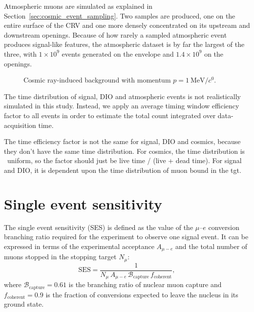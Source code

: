 Atmospheric muons are simulated as explained in
Section~\ref{sec:cosmic_event_sampling}. Two samples are produced, one on the
entire surface of the CRV and one more densely concentrated on its upstream
and downstream openings. Because of how rarely a sampled atmospheric event
produces signal-like features, the atmospheric dataset is by far the largest of
the three, with $1 \times 10^9$ events generated on the envelope and $1.4 \times
10^9$ on the openings.



\begin{figure}
    \centering
    
    \caption{Cosmic ray-induced background with momentum $p=\SI{1}{\MeV/\clight}$.}
    \label{fig:cosmic_bg_in_cydet}
\end{figure}

The time distribution of signal, DIO and atmospheric events is not realistically
simulated in this study. Instead, we apply an average timing window efficiency
factor to all events in order to estimate the total count integrated over
data-acquisition time.

The time efficiency factor is not the same for signal, DIO and cosmics,
because they don't have the same time distribution. For cosmics, the time
distribution is ~uniform, so the factor should just be live time / (live +
dead time). For signal and DIO, it is dependent upon the time distribution of
muon bound in the tgt.

\section{Single event sensitivity}
The single event sensitivity (SES) is defined as the value of the $\mu$--$e$
conversion branching ratio required for the experiment to observe one signal
event. It can be expressed in terms of the experimental acceptance $A_{\mu-e}$ and the
total number of muons stopped in the stopping target $N_\mu$:
\begin{equation}
    \mathrm{SES} = \frac{1}{N_\mu\,A_{\mu-e}\,\mathcal{B}_\mathrm{capture}\,f_\mathrm{coherent}},
\end{equation}
where $\mathcal{B}_\mathrm{capture} = 0.61$ is the branching ratio of nuclear
muon capture and $f_\mathrm{coherent} = 0.9$ is the fraction of conversions
expected to leave the nucleus in its ground state.


